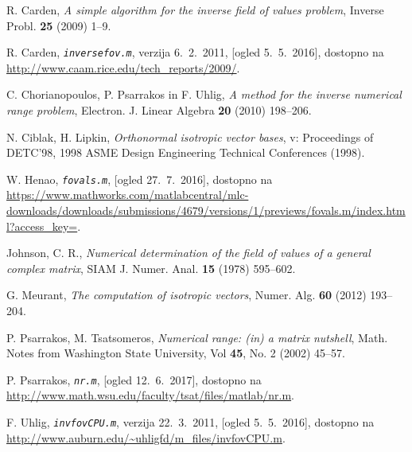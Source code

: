 \documentclass[12pt,a4paper]{amsart}
\theoremstyle{definition}
\theoremstyle{plain}
\begin{document}
\begin{thebibliography}{99}



R. Carden, \emph{A simple algorithm for the inverse field of values problem}, Inverse Probl. {\bf 25} (2009) 1--9.

R. Carden, \emph{\texttt{inversefov.m}}, verzija 6.~2.~2011, [ogled 5.~5.~2016], dostopno na \url{http://www.caam.rice.edu/tech_reports/2009/}.

C. Chorianopoulos, P. Psarrakos in F. Uhlig, \emph{A method for the inverse numerical range problem}, Electron. J. Linear Algebra {\bf 20} (2010) 198--206.

N. Ciblak, H. Lipkin, \emph{Orthonormal isotropic vector bases}, v: Proceedings of DETC'98, 1998 ASME Design Engineering Technical Conferences (1998).

W. Henao, \emph{\texttt{fovals.m}}, [ogled 27.~7.~2016], dostopno na \url{https://www.mathworks.com/matlabcentral/mlc-downloads/downloads/submissions/4679/versions/1/previews/fovals.m/index.html?access_key=}.

Johnson, C. R., \emph{Numerical determination of the field of values of a general complex matrix}, SIAM J. Numer. Anal. {\bf 15} (1978) 595--602.

G. Meurant, \emph{The computation of isotropic vectors}, Numer. Alg. {\bf 60} (2012) 193--204.

P. Psarrakos, M. Tsatsomeros, \emph{Numerical range: (in) a matrix nutshell}, Math. Notes from Washington State University,  Vol {\bf 45}, No. 2 (2002) 45--57.

P. Psarrakos, \emph{\texttt{nr.m}}, [ogled 12.~6.~2017], dostopno na \url{http://www.math.wsu.edu/faculty/tsat/files/matlab/nr.m}.

F. Uhlig, \emph{\texttt{invfovCPU.m}}, verzija 22.~3.~2011, [ogled 5.~5.~2016], dostopno na \url{http://www.auburn.edu/~uhligfd/m_files/invfovCPU.m}.

\end{thebibliography}

\newpage
\end{document}
